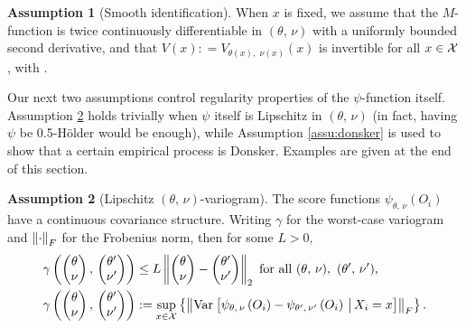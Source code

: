 \documentclass[aos]{imsart}
\theoremstyle{plain}
\theoremstyle{definition}
\newtheorem{assu}{Assumption}
\theoremstyle{remark}
\begin{document}
\begin{CJK}{UTF8}{gbsn}
\begin{assu}[Smooth identification]
\label{assu:identification}
When $x$ is fixed, we assume that the $M$-function is twice continuously differentiable
in $(\theta, \, \nu)$ with a uniformly bounded second derivative, and
that $V(x): = V_{\theta(x), \, \, \nu(x)}(x)$ is invertible for all $x \in \mathcal{X}$, with
.
\end{assu}

Our next two assumptions control regularity properties of the $\psi$-function itself.
Assumption \ref{assu:covariance} holds trivially when $\psi$ itself is
Lipschitz in $(\theta, \, \nu)$ (in fact, having $\psi$ be 0.5-H{\"o}lder would be enough),
while Assumption \ref{assu:donsker} is used to show that a certain empirical process is
Donsker. Examples are given at the end of this section.

\begin{assu}[Lipschitz $(\theta, \, \nu)$-variogram]
\label{assu:covariance}
The score functions $\psi_{\theta, \, \nu}(O_i)$ 
have a continuous covariance structure.
Writing $\gamma$ for the worst-case variogram
and $\left\lVert\cdot\right\rVert_F$ for the Frobenius norm,
then for some $L > 0$,
\begin{equation}
\label{eq:variogram}
\begin{split}
&\gamma\p{ \begin{pmatrix} \theta \\ \nu \end{pmatrix}, \,  \begin{pmatrix} \theta' \\ \nu' \end{pmatrix}} \leq
L \Norm{\begin{pmatrix} \theta \\ \nu \end{pmatrix} -   \begin{pmatrix} \theta' \\ \nu' \end{pmatrix}}_2
\text{ for all } (\theta,\, \nu), \ (\theta',\,\nu'), \\
&\gamma\p{ \begin{pmatrix} \theta \\ \nu \end{pmatrix}, \,  \begin{pmatrix} \theta' \\ \nu' \end{pmatrix}}
:= \sup_{x \in \xx} \cb{\Norm{\Var{\psi_{\theta, \, \nu}\p{O_i} - \psi_{\theta', \, \nu'}\p{O_i} \cond X_i = x}}_F}.
\end{split}
\end{equation}
\end{assu}


\end{CJK}
\end{document}
